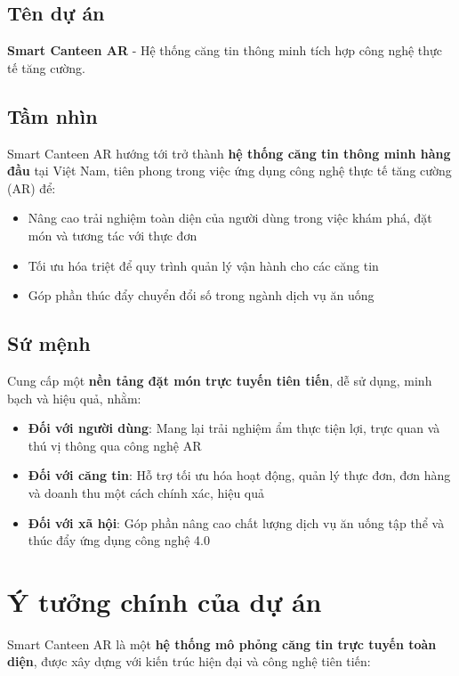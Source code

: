 \documentclass[12pt,a4paper]{article}
\begin{document}
\subsection{Tên dự án}
\textbf{Smart Canteen AR} - Hệ thống căng tin thông minh tích hợp công nghệ thực tế tăng cường.
\subsection{Tầm nhìn}
Smart Canteen AR hướng tới trở thành \textbf{hệ thống căng tin thông minh hàng đầu} tại Việt Nam, tiên phong trong việc ứng dụng công nghệ thực tế tăng cường (AR) để:

\begin{itemize}[leftmargin=1cm]
    \item Nâng cao trải nghiệm toàn diện của người dùng trong việc khám phá, đặt món và tương tác với thực đơn
    \item Tối ưu hóa triệt để quy trình quản lý vận hành cho các căng tin
    \item Góp phần thúc đẩy chuyển đổi số trong ngành dịch vụ ăn uống
\end{itemize}

\subsection{Sứ mệnh}
Cung cấp một \textbf{nền tảng đặt món trực tuyến tiên tiến}, dễ sử dụng, minh bạch và hiệu quả, nhằm:

\begin{itemize}[leftmargin=1cm]
    \item \textbf{Đối với người dùng}: Mang lại trải nghiệm ẩm thực tiện lợi, trực quan và thú vị thông qua công nghệ AR
    \item \textbf{Đối với căng tin}: Hỗ trợ tối ưu hóa hoạt động, quản lý thực đơn, đơn hàng và doanh thu một cách chính xác, hiệu quả
    \item \textbf{Đối với xã hội}: Góp phần nâng cao chất lượng dịch vụ ăn uống tập thể và thúc đẩy ứng dụng công nghệ 4.0
\end{itemize}

\section{Ý tưởng chính của dự án}

Smart Canteen AR là một \textbf{hệ thống mô phỏng căng tin trực tuyến toàn diện}, được xây dựng với kiến trúc hiện đại và công nghệ tiên tiến:
\end{document}
